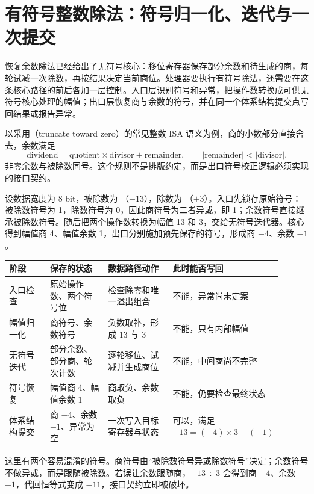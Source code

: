 \section{有符号整数除法：符号归一化、迭代与一次提交}

恢复余数除法已经给出了无符号核心：移位寄存器保存部分余数和待生成的商，每轮试减一次除数，再按结果决定当前商位。处理器要执行有符号除法，还需要在这条核心路径的前后各加一层控制。入口层识别符号和异常，把操作数转换成可供无符号核心处理的幅值；出口层恢复商与余数的符号，并在同一个体系结构提交点写回结果或报告异常。

以采用（truncate toward zero）的常见整数 ISA 语义为例，商的小数部分直接舍去，余数满足
\[
    \text{dividend}=\text{quotient}\times\text{divisor}+\text{remainder},
    \qquad |\text{remainder}|<|\text{divisor}|.
\]
非零余数与被除数同号。这个规则不是排版约定，而是出口符号校正逻辑必须实现的接口契约。


设数据宽度为 8 bit，被除数为 （$-13$），除数为 （$+3$）。入口先锁存原始符号：被除数符号为 1，除数符号为 0，因此商符号为二者异或，即 1；余数符号直接继承被除数符号。随后把两个操作数转换为幅值 13 和 3，交给无符号迭代器。核心得到幅值商 4、幅值余数 1，出口分别施加预先保存的符号，形成商 $-4$、余数 $-1$。

\begin{longtable}{L{0.17\linewidth}L{0.24\linewidth}L{0.27\linewidth}L{0.22\linewidth}}
\toprule
阶段 & 保存的状态 & 数据路径动作 & 此时能否写回 \\
\midrule
入口检查 & 原始操作数、两个符号位 & 检查除零和唯一溢出组合 & 不能，异常尚未定案 \\
幅值归一化 & 商符号、余数符号 & 负数取补，形成 13 与 3 & 不能，只有内部幅值 \\
无符号迭代 & 部分余数、部分商、轮次计数 & 逐轮移位、试减并生成商位 & 不能，中间商尚不完整 \\
符号恢复 & 幅值商 4、幅值余数 1 & 商取负、余数取负 & 不能，仍要检查最终状态 \\
体系结构提交 & 商 $-4$、余数 $-1$、异常为空 & 一次写入目标寄存器与状态 & 可以，满足 $-13=(-4)\times3+(-1)$ \\
\bottomrule
\end{longtable}

这里有两个容易混淆的符号。商符号由“被除数符号异或除数符号”决定；余数符号不做异或，而是跟随被除数。若误让余数跟随商，$-13\div3$ 会得到商 $-4$、余数 $+1$，代回恒等式变成 $-11$，接口契约立即被破坏。

